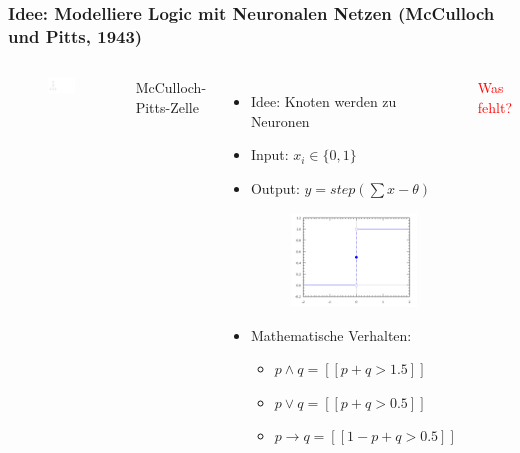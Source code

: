 \documentclass[aspectratio=169]{beamer}
\begin{document}
\begin{frame}\frametitle{Idee: Modelliere Logic mit Neuronalen Netzen (McCulloch und Pitts, 1943)}
\begin{columns}
        \begin{figure}
            \centering
            \includegraphics[trim={0 4cm 21cm 4cm },clip,width=\linewidth]{7_LNN.png}
        \end{figure}
        McCulloch-Pitts-Zelle

    \begin{itemize}
        \item Idee: Knoten werden zu Neuronen
        \item Input: $x_i \in \{0,1\}$
        \item Output: $y=step(\sum x - \theta)$
        \begin{figure}
            \includegraphics[width=0.4\linewidth]{step.png}
        \end{figure}
        \item Mathematische Verhalten:
        \begin{itemize}
            \item $p \wedge q = [\![ p+q > 1.5 ]\!]$
            \item $p \vee q = [\![ p+q > 0.5 ]\!]$
            \item $p \to q = [\![ 1-p+q > 0.5 ]\!]$
        \end{itemize}
    \end{itemize} 
        
    \pause
    \textcolor{red}{Was fehlt?}
\end{columns}
\end{frame}
\end{document}
